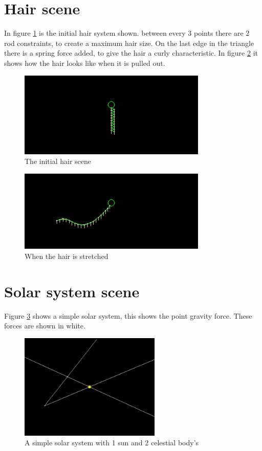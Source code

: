 \section{Hair scene}

In figure \ref{fig:HairInit} is the initial hair system shown. between every 3 points there are 2 rod constraints, to create a maximum hair size. On the last edge in the triangle there is a spring force added, to give the hair a curly characteristic. In figure \ref{fig:Hair} it shows how the hair looks like when it is pulled out.

\begin{figure}[htb!]
    \centering
    \includegraphics[width=0.8\textwidth]{images/HairInit}
    \caption{The initial hair scene}
    \label{fig:HairInit}
\end{figure}
\begin{figure}[htb!]
    \centering
    \includegraphics[width=0.8\textwidth]{images/Hair}
    \caption{When the hair is stretched}
    \label{fig:Hair}
\end{figure}

\section{Solar system scene}

Figure \ref{fig:Solar} shows a simple solar system, this shows the point gravity force. These forces are shown in white.

\begin{figure}[htb!]
    \centering
    \includegraphics[width=0.6\textwidth]{images/Solar}
    \caption{A simple solar system with 1 sun and 2 celestial body's}
    \label{fig:Solar}
\end{figure}

